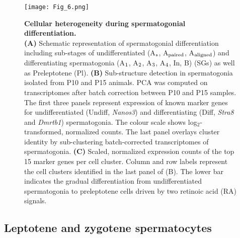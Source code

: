 \begin{figure}[!h]
\centering
\texttt{[image: Fig\_6.png]}
\caption[Cellular heterogeneity during spermatogonial differentiation]{\textbf{Cellular heterogeneity during spermatogonial differentiation.} \\
\textbf{(A)} Schematic representation of spermatogonial differentiation including sub-stages of undifferentiated (A$_\textnormal{s}$, A$_\textnormal{paired}$, A$_\textnormal{aligned}$) and differentiating spermatogonia (A$_\textnormal{1}$, A$_\textnormal{2}$, A$_\textnormal{3}$, A$_\textnormal{4}$, In, B) (SGs) as well as Preleptotene (Pl). \textbf{(B)} Sub-structure detection in spermatogonia isolated from P10 and P15 animals. PCA was computed on transcriptomes after batch correction between P10 and P15 samples. The first three panels represent expression of known marker genes for undifferentiated (Undiff, \textit{Nanos3}) and differentiating (Diff, \textit{Stra8} and \textit{Dmrtb1}) spermatogonia. The colour scale shows log$_2$-transformed, normalized counts. The last panel overlays cluster identity by sub-clustering batch-corrected transcriptomes of spermatogonia. \textbf{(C)} Scaled, normalized expression counts of the top 15 marker genes per cell cluster. Column and row labels represent the cell clusters identified in the last panel of (B). The lower bar indicates the gradual differentiation from undifferentiated spermatogonia to preleptotene cells driven by two retinoic acid (RA) signals. }
\label{fig3:spermatogonia}
\end{figure}

\subsection{Leptotene and zygotene spermatocytes}

